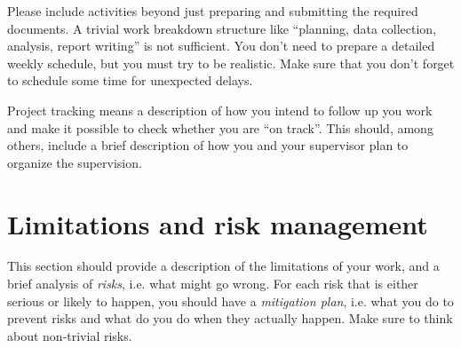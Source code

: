\documentclass[12pt,a4paper,twoside]{article}
\begin{document}
Please include activities beyond just preparing and submitting the required documents.
A trivial work breakdown structure like ``planning, data collection, analysis,
report writing'' is not sufficient. You don't need to prepare a detailed weekly
schedule, but you must try to be realistic. Make sure that you don't forget to
schedule some time for unexpected delays.

Project tracking means a description of how you intend to follow up you work and
make it possible to check whether you are ``on track''. This should, among others,
include a brief description of how you and your supervisor plan to organize
the supervision.


\section{Limitations and risk management}
\label{sec:risks}
This section should provide a description of the limitations of your
work, and a brief analysis of \textit{risks}, i.e. what might go wrong. For each risk that
is either serious or likely to happen, you should have a \textit{mitigation plan}, i.e.
what you do to prevent risks and what do you do when they actually happen.
Make sure to think about non-trivial risks.






\appendix
\newpage
\end{document}
